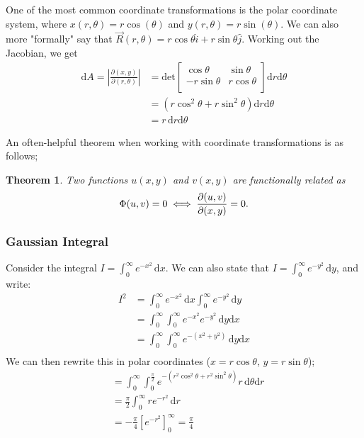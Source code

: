 \documentclass[12pt]{article}
\newtheorem{theorem}{Theorem}
\begin{document}
{One of the most common coordinate transformations is the polar coordinate system, where $x(r,\theta) = r \cos (\theta)$ and $y(r, \theta) = r \sin(\theta)$. We can also more "formally" say that $\vec{R}(r, \theta) = r \cos \theta \hat{i} + r \sin \theta \hat{j}$. Working out the Jacobian, we get \begin{align*}
    \text{d}A = |\frac{\partial(x,y)}{\partial(r,\theta)}| &= \text{det}\begin{bmatrix}
       \cos \theta & \sin \theta\\
        -r \sin \theta & r \cos \theta\\
    \end{bmatrix} \text{d}r \text{d}\theta\\
    &=  (r\cos^2 \theta + r \sin^2 \theta) \text{d}r \text{d}\theta \\
    &= r\,\text{d}r \text{d}\theta
\end{align*}

An often-helpful theorem when working with coordinate transformations is as follows;
\begin{theorem}
    Two functions $u(x,y)$ and $v(x,y)$ are functionally related as \[\Phi(u, v) = 0 \iff \frac{\partial (u,v)}{\partial (x,y)} = 0.\]
\end{theorem}

\subsubsection{Gaussian Integral}

Consider the integral $I = \int_0^{\infty} e^{-x^2} \,\text{d}x$. We can also state that $I = \int_{0}^{\infty} e^{-y^2} \,\text{d}y$, and write: \begin{align*}
    I^2 &= \int_{0}^{\infty} e^{-x^2} \, \text{d}x \int_{0}^{\infty} e^{-y^2} \,\text{d}y\\
    &= \int_{0}^{\infty}\int_{0}^{\infty} e^{-x^2} e^{-y^2} \, \text{d}y\text{d}x\\
    &= \int_{0}^{\infty}\int_{0}^{\infty} e^{-(x^2+y^2)}\, \text{d}y\text{d}x\\
\end{align*}
We can then rewrite this in polar coordinates ($x = r\cos \theta$, $y = r\sin\theta$);
\begin{align*}
    &= \int_{0}^{\infty}\int_{0}^{\frac{\pi}{2}} e^{-(r^2\cos^2 \theta+r^2\sin^2\theta)} r\, \text{d}\theta\text{d}r\\
    &= \frac{\pi}{2} \int_{0}^{\infty}r e^{-r^2} \,\text{d}r\\
    &= -\frac{\pi}{4}\left[e^{-r^2}\right]_0^{\infty} = \frac{\pi}{4}
\end{align*}

}
\end{document}
